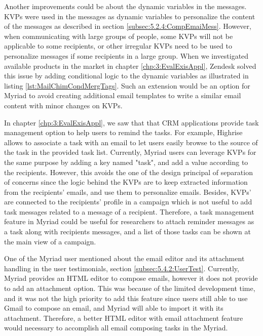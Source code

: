 Another improvements could be about the dynamic variables in the messages. \ac{KVP}s were used in the messages as dynamic variables to personalize the content of the messages as described in section \ref{subsec:5.2.4:CompEmaiMess}. However, when communicating with large groups of people, some \ac{KVP}s will not be applicable to some recipients, or other irregular \ac{KVP}s need to be used to personalize messages if some recipients in a large group. When we investigated available products in the market in chapter \ref{chp:3:EvalExisAppl}, Zendesk solved this issue by adding conditional logic to the dynamic variables as illustrated in listing \ref{lst:MailChimCondMergTags}. Such an extension would be an option for Myriad to avoid creating additional email templates to write a similar email content with minor changes on \ac{KVP}s.
\vspace{1cm}

In chapter \ref{chp:3:EvalExisAppl}, we saw that that \ac{CRM} applications provide task management option to help users to remind the tasks. For example, Highrise allows to associate a task with an email to let users easily browse to the source of the task in the provided task list. Currently, Myriad users can leverage \ac{KVP}s for the same purpose by adding a key named "task", and add a value according to the recipients. However, this avoids the one of the design principal of separation of concerns since the logic behind the \ac{KVP}s are to keep extracted information from the recipients' emails, and use them to personalize emails. Besides, \ac{KVP}s' are connected to the recipients' profile in a campaign which is not useful to add task messages related to a message of a recipient. Therefore, a task management feature in Myriad could be useful for researchers to attach reminder messages as a task along with recipients messages, and a list of those tasks can be shown at the main view of a campaign.
\vspace{1cm}

One of the Myriad user mentioned about the email editor and its attachment handling in the user testimonials, section \ref{subsec:5.4.2:UserTest}. Currently, Myriad provides an \ac{HTML} editor to compose emails, however it does not provide to add an attachment option. This was because of the limited development time, and it was not the high priority to add this feature since users still able to use Gmail to compose an email, and Myriad will able to import it with its attachment. Therefore, a better \ac{HTML} editor with email attachment feature would necessary to accomplish all email composing tasks in the Myriad.
\vspace{1cm}

